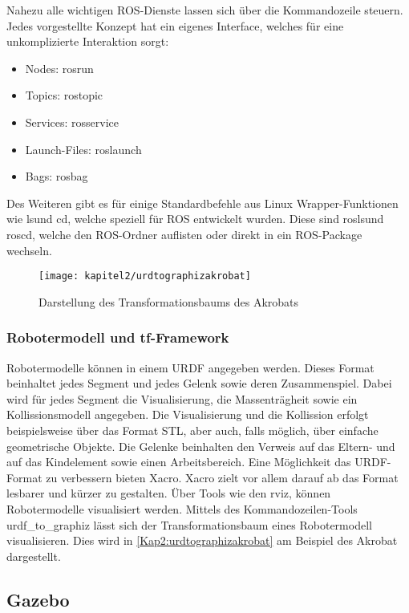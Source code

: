 Nahezu alle wichtigen \ac{ROS}-Dienste lassen sich über die Kommandozeile steuern. Jedes vorgestellte Konzept hat ein eigenes Interface, welches für eine unkomplizierte Interaktion sorgt:
\begin{itemize}
\item Nodes: rosrun
\item Topics: rostopic
\item Services: rosservice
\item Launch-Files: roslaunch
\item Bags: rosbag
\end{itemize}

Des Weiteren gibt es für einige Standardbefehle aus Linux Wrapper-Funktionen wie \glq ls\grq und \glq cd\grq, welche speziell für \ac{ROS} entwickelt wurden. Diese sind \glq rosls\grq und \glq roscd\grq, welche den \ac{ROS}-Ordner auflisten oder direkt in ein \ac{ROS}-Package wechseln.

\begin{figure}[t!]
  \centering
  \texttt{[image: kapitel2/urdtographizakrobat]}
  \caption{Darstellung des Transformationsbaums des Akrobats}
  \label{Kap2:urdtographizakrobat}
\end{figure}

\subsubsection{Robotermodell und tf-Framework}

Robotermodelle können in einem \ac{URDF} angegeben werden. Dieses Format beinhaltet jedes Segment und jedes Gelenk sowie deren Zusammenspiel. Dabei wird für jedes Segment die Visualisierung, die Massenträgheit sowie ein Kollissionsmodell angegeben. Die Visualisierung und die Kollission erfolgt beispielsweise über das Format \ac{STL}, aber auch, falls möglich, über einfache geometrische Objekte. Die Gelenke beinhalten den Verweis auf das Eltern- und auf das Kindelement sowie einen Arbeitsbereich. Eine Möglichkeit das \ac{URDF}-Format zu verbessern bieten \ac{Xacro}. \ac{Xacro} zielt vor allem darauf ab das Format lesbarer und kürzer zu gestalten. Über Tools wie den rviz, können Robotermodelle visualisiert werden. Mittels des Kommandozeilen-Tools urdf\_to\_graphiz lässt sich der Transformationsbaum eines Robotermodell visualisieren. Dies wird in \autoref{Kap2:urdtographizakrobat} am Beispiel des Akrobat dargestellt.

\subsection{Gazebo}

